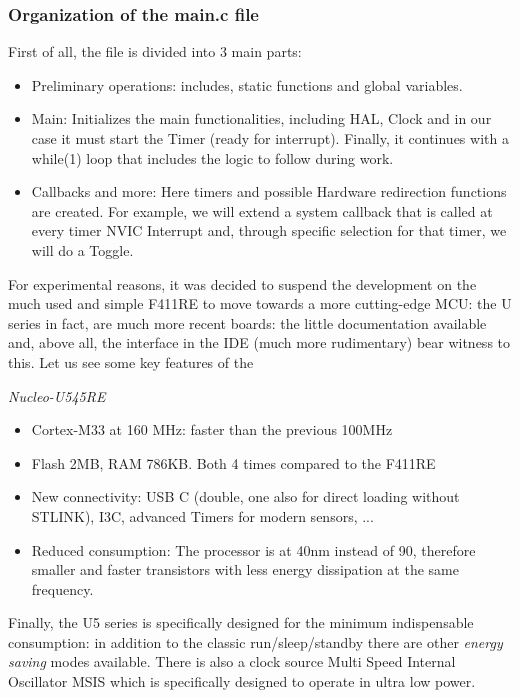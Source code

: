 \subsubsection{Organization of the main.c file }

First of all, the file is divided into 3 main parts:
\begin{itemize}
    \item Preliminary operations: includes, static functions and global variables.
    \item Main: Initializes the main functionalities, including HAL, Clock and in our case it must start the Timer (ready for interrupt). Finally, it continues with a while(1) loop that includes the logic to follow during work.
    \item Callbacks and more: Here timers and possible Hardware redirection functions are created. For example, we will extend a system callback that is called at every timer NVIC Interrupt and, through specific selection for that timer, we will do a Toggle.
\end{itemize}

For experimental reasons, it was decided to suspend the development on the much used and simple F411RE to move towards a more cutting-edge MCU: the U series in fact, are much more recent boards: the little documentation available and, above all, the interface in the IDE (much more rudimentary) bear witness to this. Let us see some key features of the
\begin{center}
    \textit{Nucleo-U545RE}
\end{center}

\begin{itemize}
    \item Cortex-M33 at 160 MHz: faster than the previous 100MHz
    \item Flash 2MB, RAM 786KB. Both 4 times compared to the F411RE
    \item New connectivity: USB C (double, one also for direct loading without STLINK), I3C, advanced Timers for modern sensors, ...
    \item Reduced consumption: The processor is at 40nm instead of 90, therefore smaller and faster transistors with less energy dissipation at the same frequency.
\end{itemize}

Finally, the U5 series is specifically designed for the minimum indispensable consumption: in addition to the classic run/sleep/standby there are other \textit{energy saving} modes available. There is also a clock source Multi Speed Internal Oscillator MSIS which is specifically designed to operate in ultra low power.

